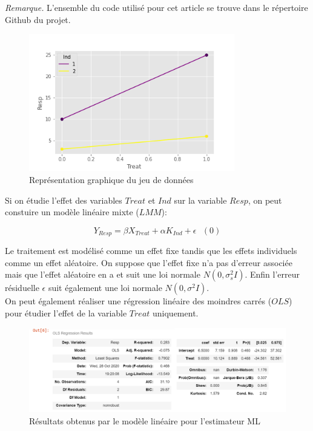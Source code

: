 \vspace{4mm}

\emph{Remarque.} L'ensemble du code utilisé pour cet article se trouve dans le répertoire Github du projet.

\begin{figure}[H]
\centering
\includegraphics[width = 0.8\textwidth]{points.png}
\caption{Représentation graphique du jeu de données}
\end{figure}

\vspace{4mm}

Si on étudie l'effet des variables $Treat$ et $Ind$ sur la variable $Resp$, on peut constuire un modèle linéaire mixte ($LMM$): 

$$Y_{Resp}= \beta X_{Treat} + \alpha K_{Ind} + \epsilon \ \ \ (0) $$

Le traitement est modélisé comme un effet fixe tandis que les effets individuels comme un effet aléatoire. On suppose que l'effet fixe n'a pas d'erreur associée mais que l'effet aléatoire en a et suit une loi normale $N(0,\sigma_s^2I)$. Enfin l'erreur résiduelle $\epsilon$ suit également une loi normale $N(0, \sigma^2I)$.\\
On peut également réaliser une régression linéaire des moindres carrés ($OLS$) pour étudier l'effet de la variable $Treat$ uniquement.


\vspace{4mm}

\begin{figure}[H]
\centering
\includegraphics[width = 1\textwidth]{sortie OLS.png}
\caption{Résultats obtenus par le modèle linéaire pour l'estimateur ML}
\end{figure}


